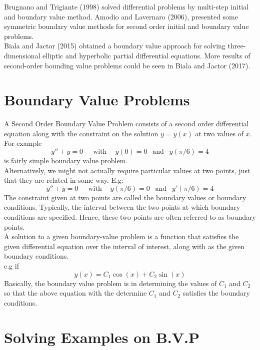 \documentclass[12pt]{report}
\newcommand{\sps}{\\[0.2cm]}
\newcommand{\NI}{\noindent}
\newcommand{\sprime}{'}
\newcommand{\dprime}{''}
\begin{document}
	\NI Brugnano and Trigiante (1998) solved differential problems by multi-step initial and boundary value method. Amodio and Lavernaro (2006), presented some symmetric boundary value methods for second order initial and boundary value problems.\sps
	
	\NI Biala and Jactor (2015) obtained a boundary value approach for solving three-dimensional elliptic and hyperbolic partial differential equations. More results of second-order bounding value problems could be seen in Biala and Jactor (2017).\sps
	
	\section{Boundary Value Problems}
	A Second Order Boundary Value Problem consists of a second order differential equation along with the constraint on the solution $y=y(x)$ at two values of $x$. For example
	\begin{equation}
		y\dprime + y = 0 ~~~~~\text{ with }~~~~ y(0) = 0 ~~\text{ and }~~ y(\pi/6) = 4 \label{eq:2_1}
	\end{equation}
	is fairly simple boundary value problem.\sps
	Alternatively, we might not actually require particular values at two points, just that they are related in some way. E.g:
	\begin{equation}
		y\dprime + y = 0 ~~~~~\text{ with }~~~~ y(\pi/6) = 0 ~~\text{ and }~~ y\sprime(\pi/6) = 4 \label{eq:2_2}
	\end{equation}
	The constraint given at two points are called the boundary values or boundary conditions. Typically, the interval between the two points at which boundary conditions are specified. Hence, these two points are often referred to as boundary points.\sps
	
	\NI A solution to a given boundary-value problem is a function that satisfies the given differential equation over the interval of interest, along with as the given boundary conditions.\sps
	e.g if
	\begin{equation}
		y(x) = C_1\cos(x) + C_2\sin(x)
	\end{equation}
	Basically, the boundary value problem is in determining the values of $C_1$ and $C_2$ so that the above equation with the determine $C_1$ and $C_2$ satisfies the boundary conditions.\sps
	
	\section{Solving Examples on B.V.P}
\end{document}
